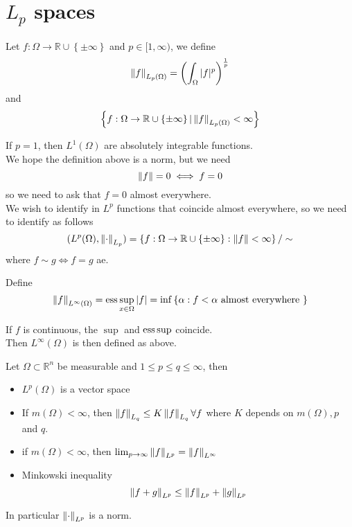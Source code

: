 \documentclass[../main.tex]{subfiles}
\begin{document}
\section{ $L_p$ spaces}
\begin{defn}[Lp space]
	Let $f:\Omega\to \mathbb{R}\cup \left\{ \pm \infty  \right\} $ and $p \in [ 1, \infty ) $, we define
	\[ 
	\left\lVert f\right\rVert _{L_p( \Omega) } = \left( \int_{ \Omega }^{  } |f|^{p}\right) ^{\frac{1}{p}}
	\]
	and
	\[ 
	\left\{ f: \Omega\to \mathbb{R}\cup \left\{ \pm \infty  \right\} | \left\lVert f\right\rVert _{L_p( \Omega) } < \infty  \right\} 
	\]
	
	
\end{defn}
\begin{rmq}
If $p=1$, then $L^{1}( \Omega) $ are absolutely integrable functions.\\
We hope the definition above is a norm, but we need
\[ 
\left\lVert f \right\rVert  = 0 \iff f=0
\]
so we need to ask that $f=0$ almost everywhere.\\
We wish to identify in $L^{p}$ functions that coincide almost everywhere, so we need to identify as follows
\[ 
	( L^{p}( \Omega) , \left\lVert \cdot\right\rVert _{L_p} ) = \left\{ f: \Omega\to \mathbb{R}\cup \left\{ \pm \infty  \right\} : \left\lVert f\right\rVert < \infty  \right\} / \sim
\]
where $f\sim g \iff f=g $ ae.


\end{rmq}
\begin{defn}[L infinity]
	Define
	\[ 
	\left\lVert f\right\rVert_{L^{ \infty }( \Omega) } = \operatorname{ess} \sup_{x\in \Omega} |f|= \inf \left\{ \alpha: f< \alpha \text{ almost everywhere }  \right\} 
	\]
	
\end{defn}
If $f$ is continuous, the $\sup$ and $\operatorname{ess}\sup$ coincide.\\
Then $ L^{ \infty }( \Omega) $  is then defined as above.
\begin{propo}
Let $\Omega \subset \mathbb{R}^{n}$ be measurable and $1 \leq p \leq q \leq \infty $, then
\begin{itemize}
\item $L^{p}( \Omega) $ is a vector space
\item If $m( \Omega) < \infty $, then $\left\lVert f\right\rVert_{L_q} \leq K \left\lVert f\right\rVert _{L_q} \forall f$ where $K$ depends on $m( \Omega) , p$ and $q$.
\item if $m( \Omega) < \infty $, then $\lim_{p \to \infty } \left\lVert f\right\rVert _{L^{p}} = \left\lVert f\right\rVert _{L^{ \infty }} $ 
\item Minkowski inequality
	\[ 
	\left\lVert f+g\right\rVert _{L^p} \leq \left\lVert f\right\rVert _{L^p} + \left\lVert g\right\rVert _{L^p} 
	\]
	
\end{itemize}
In particular $\left\lVert\cdot\right\rVert_{L^p} $ is a norm.

\end{propo}
\end{document}
